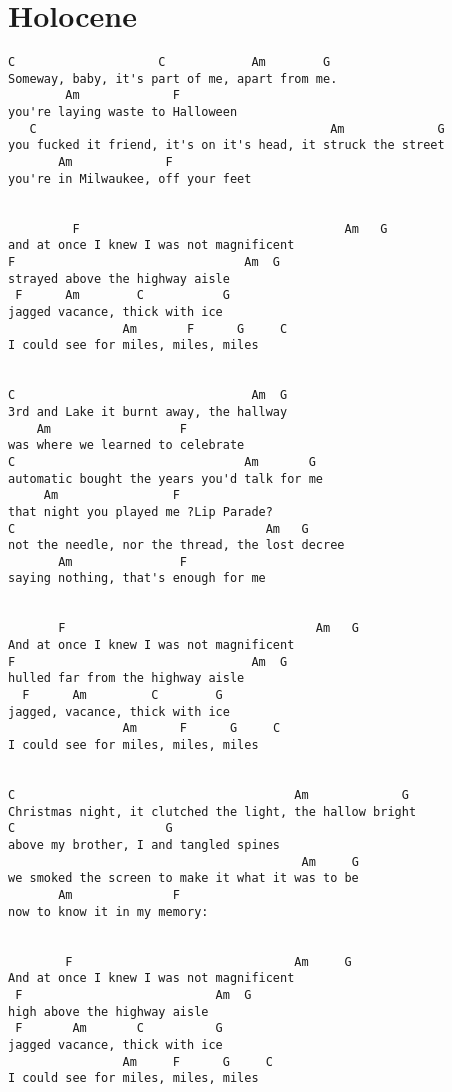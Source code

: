 \documentclass[leqno]{memoir}
\begin{document}
\chapter{Holocene}
\begin{verbatim}
C                    C            Am        G    
Someway, baby, it's part of me, apart from me.
        Am             F
you're laying waste to Halloween 
   C                                         Am             G
you fucked it friend, it's on it's head, it struck the street 
       Am             F
you're in Milwaukee, off your feet 


         F                                     Am   G   
and at once I knew I was not magnificent 
F                                Am  G
strayed above the highway aisle 
 F      Am        C           G
jagged vacance, thick with ice 
                Am       F      G     C   
I could see for miles, miles, miles 


C                                 Am  G
3rd and Lake it burnt away, the hallway 
    Am                  F
was where we learned to celebrate 
C                                Am       G
automatic bought the years you'd talk for me 
     Am                F
that night you played me ?Lip Parade? 
C                                   Am   G
not the needle, nor the thread, the lost decree 
       Am               F
saying nothing, that's enough for me 


       F                                   Am   G
And at once I knew I was not magnificent 
F                                 Am  G
hulled far from the highway aisle 
  F      Am         C        G
jagged, vacance, thick with ice
                Am      F      G     C
I could see for miles, miles, miles 


C                                       Am             G
Christmas night, it clutched the light, the hallow bright 
C                     G
above my brother, I and tangled spines 
                                         Am     G
we smoked the screen to make it what it was to be 
       Am              F
now to know it in my memory: 

 
        F                               Am     G
And at once I knew I was not magnificent 
 F                           Am  G
high above the highway aisle 
 F       Am       C          G
jagged vacance, thick with ice 
                Am     F      G     C
I could see for miles, miles, miles
\end{verbatim}
\newpage
\end{document}
